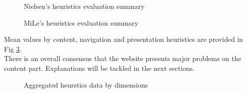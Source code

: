 \begin{figure}[!ht]
    \begin{minipage}{\linewidth}
        \centering
        \captionsetup{justification=centering}
        \caption{Nielsen's heuristics evaluation summary}
        \label{BarsNielsenCrop}
    \end{minipage}
\end{figure}

\begin{figure}[!ht]
    \begin{minipage}{\linewidth}
        \centering
        \captionsetup{justification=centering}
        \caption{MiLe's heuristics evaluation summary}
        \label{BarsMileCrop}
    \end{minipage}
\end{figure}

Mean values by content, navigation and presentation heuristics are provided in Fig \ref{BarsAggregated}.\\
There is an overall consensus that the website presents major problems on the content part. Explanations will be tackled in the next sections. 

\begin{figure}[!ht]
    \begin{minipage}{\linewidth}
        \centering
        \captionsetup{justification=centering}
        \caption{Aggregated heurstics data by dimensions}
        \label{BarsAggregated}
    \end{minipage}
\end{figure}


